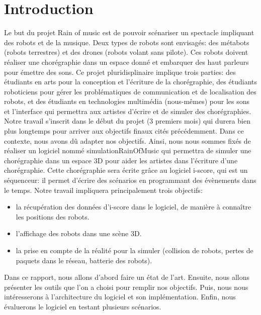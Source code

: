 \section{Introduction}

Le but du projet Rain of music est de pouvoir scénariser un spectacle impliquant des robots et de la musique. Deux types de robots sont envisagés: des métabots (robots terrestres) et des drones (robots volant sans pilote). Ces robots doivent réaliser une chorégraphie dans un espace donné et embarquer des haut parleurs pour émettre des sons. Ce projet pluridisplinaire implique trois parties: des étudiants en arts pour la conception et l'écriture de la chorégraphie, des étudiants roboticiens pour gérer les problématiques de communication et de localisation des robots, et des étudiants en technologies multimédia (nous-mêmes) pour les sons et l'interface qui permettra aux artistes d'écrire et de simuler des chorégraphies. \\

Notre travail s'inscrit dans le début du projet (3 premiers mois) qui durera bien plus longtemps pour arriver aux objectifs finaux cités précédemment. Dans ce contexte, nous avons dû adapter nos objectifs. Ainsi, nous nous sommes fixés de réaliser un logiciel nommé simulationRainOfMusic qui permettra de simuler une chorégraphie dans un espace 3D pour aider les artistes dans l'écriture d'une chorégraphie. Cette chorégraphie sera écrite grâce au logiciel i-score, qui est un séquenceur: il permet d'écrire des scénarios en programmant des évènements dans le temps. Notre travail impliquera principalement trois objectifs: 
\begin{itemize}
\item la récupération des données d'i-score dans le logiciel, de manière à connaître les positions des robots.
\item l'affichage des robots dans une scène 3D.
\item la prise en compte de la réalité pour la simuler (collision de robots, pertes de paquets dans le réseau, batterie des robots).
\end{itemize} 

Dans ce rapport, nous allons d'abord faire un état de l'art. Ensuite, nous allons présenter les outils que l'on a choisi pour remplir nos objectifs. Puis, nous nous intéresserons à l'architecture du logiciel et son implémentation. Enfin, nous évaluerons le logiciel en testant plusieurs scénarios. \\